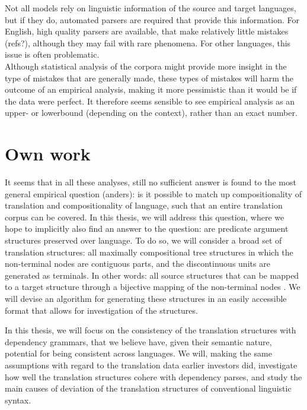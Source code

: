 \documentclass{report}
\begin{document}
Not all models rely on linguistic information of the source and target languages, but if they do, automated parsers are required that provide this information. For English, high quality parsers are available, that make relatively little mistakes (refs?), although they may fail with rare phenomena. For other languages, this issue is often problematic.\\

Although statistical analysis of the corpora might provide more insight in the type of mistakes that are generally made, these types of mistakes will harm the outcome of an empirical analysis, making it more pessimistic than it would be if the data were perfect. It therefore seems sensible to see empirical analysis as an upper- or lowerbound (depending on the context), rather than an exact number.








\chapter{Own work}

It seems that in all these analyses, still no sufficient answer is found to the most general empirical question (anders): is it possible to match up compositionality of translation and compositionality of language, such that an entire translation corpus can be covered. In this thesis, we will address this question, where we hope to implicitly also find an answer to the question: are predicate argument structures preserved over language. To do so, we will consider a broad set of translation structures: all maximally compositional tree structures in which the non-terminal nodes are contiguous parts, and the discontinuous units are generated as terminals. In other words: all source structures that can be mapped to a target structure through a bijective mapping of the non-terminal nodes \citep[this set was previously defined in][]{simaan2013hats}. We will devise an algorithm for generating these structures in an easily accessible format that allows for investigation of the structures.

In this thesis, we will focus on the consistency of the translation structures with dependency grammars, that we believe have, given their semantic nature, potential for being consistent across languages. We will, making the same assumptions with regard to the translation data earlier investors did, investigate how well the translation structures cohere with dependency parses, and study the main causes of deviation of the translation structures of conventional linguistic syntax.
\end{document}
